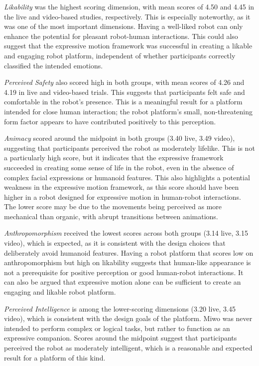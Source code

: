 \textit{Likability} was the highest scoring dimension, with mean scores of 4.50 and 4.45 in the live and video-based studies, respectively. This is especially noteworthy, as it was one of the most important dimensions. Having a well-liked robot can only enhance the potential for pleasant robot-human interactions. This could also suggest that the expressive motion framework was successful in creating a likable and engaging robot platform, independent of whether participants correctly classified the intended emotions.

\textit{Perceived Safety} also scored high in both groups, with mean scores of 4.26 and 4.19 in live and video-based trials. This suggests that participants felt safe and comfortable in the robot's presence. This is a meaningful result for a platform intended for close human interaction; the robot platform's small, non-threatening form factor appears to have contributed positively to this perception.

\textit{Animacy} scored around the midpoint in both groups (3.40 live, 3.49 video), suggesting that participants perceived the robot as moderately lifelike.  This is not a particularly high score, but it indicates that the expressive framework succeeded in creating some sense of life in the robot, even in the absence of complex facial expressions or humanoid features. This also highlights a potential weakness in the expressive motion framework, as this score should have been higher in a robot designed for expressive motion in human-robot interactions. The lower score may be due to the movements being perceived as more mechanical than organic, with abrupt transitions between animations.

\textit{Anthropomorphism} received the lowest scores across both groups (3.14 live, 3.15 video), which is expected, as it is consistent with the design choices that deliberately avoid humanoid features. Having a robot platform that scores low on anthropomorphism but high on likability suggests that human-like appearance is not a prerequisite for positive perception or good human-robot interactions. It can also be argued that expressive motion alone can be sufficient to create an engaging and likable robot platform.

\textit{Perceived Intelligence} is among the lower-scoring dimensions (3.20 live, 3.45 video), which is consistent with the design goals of the platform. Miwo was never intended to perform complex or logical tasks, but rather to function as an expressive companion. Scores around the midpoint suggest that participants perceived the robot as moderately intelligent, which is a reasonable and expected result for a platform of this kind.

